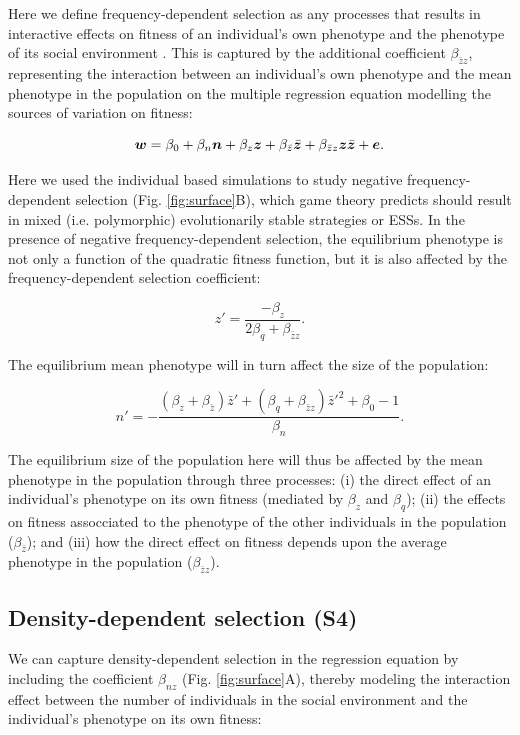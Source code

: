 \documentclass{article}
\begin{document}
 Here we define frequency-dependent selection as any processes that results in interactive effects on fitness of an individual's own phenotype and the phenotype of its social environment \citep{Araya-Ajoy2020}. This is captured by the additional coefficient $\beta_{\bar{z}z}$, representing the interaction between an individual's own phenotype and the mean phenotype in the population on the multiple regression equation modelling the sources of variation on fitness:  

\begin{equation} \label{eq: FDS}
\vectorsym{w}=\beta_{0} +\beta_{n} \vectorsym{n} + \beta_{z} \vectorsym{z}+ \beta_{\bar{z}} \vectorsym{\bar{z}}  + \beta_{\bar{z}z} \vectorsym{z\bar{z}}  +  \vectorsym{e}.
\end{equation}

\noindent Here we used the individual based simulations to study negative frequency-dependent selection (Fig. \ref{fig:surface}B), which game theory predicts should result in mixed (i.e. polymorphic) evolutionarily stable strategies or ESSs. In the presence of negative frequency-dependent selection, the equilibrium phenotype is not only a function of the quadratic fitness function, but it is also affected by the frequency-dependent selection coefficient:

\begin{equation} 
z'=\frac{-\beta_{z}}{2\beta_{q} + \beta_{\bar{z}z}}.
\end{equation} 

\noindent The equilibrium mean phenotype will in turn affect the size of the population:

\begin{equation}
n' = -\frac{(\beta_{z}   + \beta_{\bar{z}})\bar{z}' + (\beta_{q} + \beta_{\bar{z}z})\bar{z}'^2+\beta_{0} -1}{\beta_{n}}.
\end{equation}

\noindent The equilibrium size of the population here will thus be affected by the mean phenotype in the population through three processes: (i) the direct effect of an individual's phenotype on its own fitness (mediated by $\beta_z$ and $ \beta_q$); (ii) the effects on fitness assocciated to the phenotype of the other individuals in the population ($\beta_{\bar{z}}$); and (iii) how the direct effect on fitness depends upon the average phenotype in the population ($\beta_{\bar{z}z}$).
 
\subsection{Density-dependent selection (S4)}
 We can capture density-dependent selection in the regression equation by including the coefficient $\beta_{nz}$ (Fig. \ref{fig:surface}A), thereby modeling the interaction effect between the number of individuals in the social environment and the individual's phenotype on its own fitness:
\end{document}
